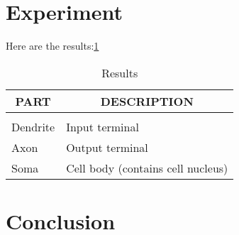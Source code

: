 \documentclass{article} %
\begin{document}
\section{Experiment}
Here are the results:\ref{results-table}
\begin{table}[t]
\caption{Results}
\label{results-table}
\begin{center}
\begin{tabular}{ll}
\multicolumn{1}{c}{\bf PART}  &\multicolumn{1}{c}{\bf DESCRIPTION}
\\ \hline \\
Dendrite         &Input terminal \\
Axon             &Output terminal \\
Soma             &Cell body (contains cell nucleus) \\
\end{tabular}
\end{center}
\end{table}

\section{Conclusion}



\nocite{*}
\end{document}
